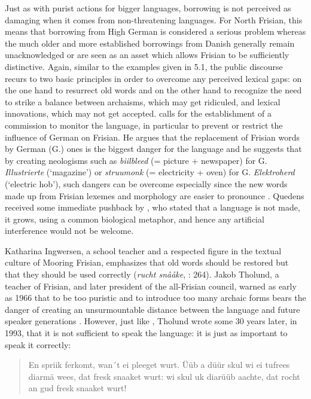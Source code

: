\documentclass[output=paper]{langsci/langscibook}
\begin{document}
Just as with purist actions for bigger languages, borrowing is not perceived as damaging when it comes from non-threatening languages. For North Frisian, this means that borrowing from High German is considered a serious problem whereas the much older and more established borrowings from Danish generally remain unacknowledged or are seen as an asset which allows Frisian to be sufficiently distinctive. Again, similar to the examples given in 5.1, the public discourse recurs to two basic principles in order to overcome any perceived lexical gaps: on the one hand to resurrect old words and on the other hand to recognize the need to strike a balance between archaisms, which may get ridiculed, and lexical innovations, which may not get accepted. \citet{Quedens1967} calls for the establishment of a commission to monitor the language, in particular to prevent or restrict the influence of German on Frisian. He argues that the replacement of Frisian words by German (G.) ones is the biggest danger for the language and he suggests that by creating neologisms such as \textit{biilbleed} (= picture + newspaper) for G. \textit{Illustrierte} (‘magazine’) or \textit{struumonk} (= electricity + oven) for G. \textit{Elektroherd} (‘electric hob’), such dangers can be overcome especially since the new words made up from Frisian lexemes and morphology are easier to pronounce \citep[95]{Quedens1967}. Quedens received some immediate pushback by \citet{Preisler1968}, who stated that a language is not made, it grows, using a common biological metaphor, and hence any artificial interference would not be welcome.

Katharina Ingwersen, a school teacher and a respected figure in the textual culture of Mooring Frisian, emphasizes that old words should be restored but that they should be used correctly (\textit{rucht snååke}, \citealt{Ingwersen1966}: 264). Jakob Tholund, a teacher of Frisian, and later president of the all-Frisian council, warned as early as 1966 that to be too puristic and to introduce too many archaic forms bears the danger of creating an unsurmountable distance between the language and future speaker generations \citep[31]{Tholund1966}. However, just like \citet{Ingwersen1966}, Tholund wrote some 30 years later, in 1993, that it is not sufficient to speak the language: it is just as important to speak it correctly: 

\begin{quote}
En spriik ferkomt, wan´t ei pleeget wurt. Üüb a düür skul wi ei tufrees diarmä wees, dat fresk snaaket wurt: wi skul uk diarüüb aachte, dat rocht an gud fresk snaaket wurt! \citep[17]{Tholund1993}\bigskip\\
\end{quote}
\end{document}
